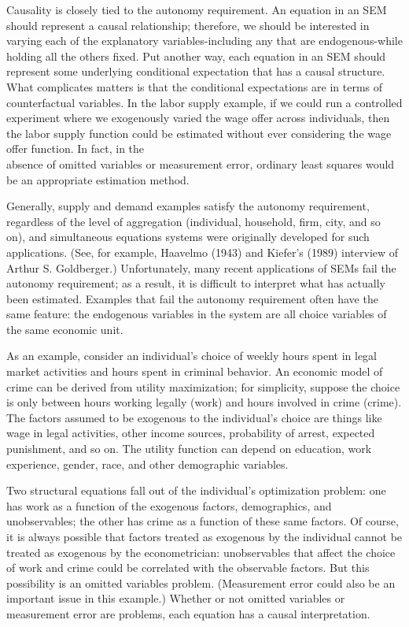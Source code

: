 \documentclass[10pt]{article}
\begin{document}
Causality is closely tied to the autonomy requirement. An equation in an SEM should represent a causal relationship; therefore, we should be interested in varying each of the explanatory variables-including any that are endogenous-while holding all the others fixed. Put another way, each equation in an SEM should represent some underlying conditional expectation that has a causal structure. What complicates matters is that the conditional expectations are in terms of counterfactual variables. In the labor supply example, if we could run a controlled experiment where we exogenously varied the wage offer across individuals, then the labor supply function could be estimated without ever considering the wage offer function. In fact, in the\\
absence of omitted variables or measurement error, ordinary least squares would be an appropriate estimation method.

Generally, supply and demand examples satisfy the autonomy requirement, regardless of the level of aggregation (individual, household, firm, city, and so on), and simultaneous equations systems were originally developed for such applications. (See, for example, Haavelmo (1943) and Kiefer's (1989) interview of Arthur S. Goldberger.) Unfortunately, many recent applications of SEMs fail the autonomy requirement; as a result, it is difficult to interpret what has actually been estimated. Examples that fail the autonomy requirement often have the same feature: the endogenous variables in the system are all choice variables of the same economic unit.

As an example, consider an individual's choice of weekly hours spent in legal market activities and hours spent in criminal behavior. An economic model of crime can be derived from utility maximization; for simplicity, suppose the choice is only between hours working legally (work) and hours involved in crime (crime). The factors assumed to be exogenous to the individual's choice are things like wage in legal activities, other income sources, probability of arrest, expected punishment, and so on. The utility function can depend on education, work experience, gender, race, and other demographic variables.

Two structural equations fall out of the individual's optimization problem: one has work as a function of the exogenous factors, demographics, and unobservables; the other has crime as a function of these same factors. Of course, it is always possible that factors treated as exogenous by the individual cannot be treated as exogenous by the econometrician: unobservables that affect the choice of work and crime could be correlated with the observable factors. But this possibility is an omitted variables problem. (Measurement error could also be an important issue in this example.) Whether or not omitted variables or measurement error are problems, each equation has a causal interpretation.
\end{document}
